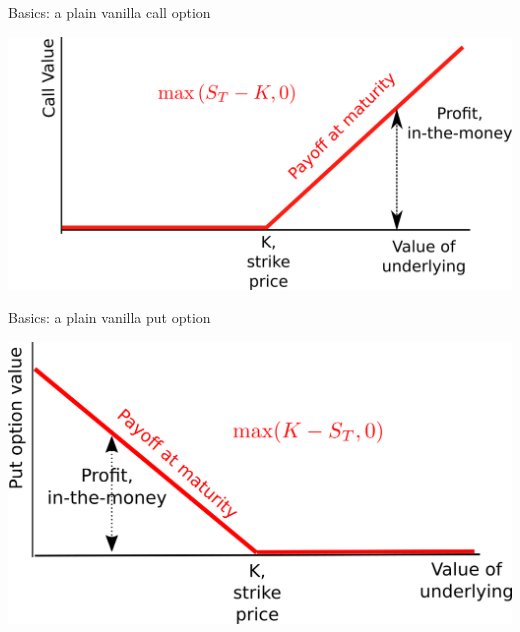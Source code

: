 \documentclass[ignorenonframetext,aspectratio=169]{beamer}
\begin{document}
\begin{frame}{Basics: a plain vanilla call option}

\begin{center}\includegraphics[width=0.8\linewidth]{images/figCallOptionMaturity} \end{center}

\end{frame}

\begin{frame}{Basics: a plain vanilla put option}

\begin{center}\includegraphics[width=0.8\linewidth]{images/figPutOptionMaturity} \end{center}

\end{frame}
\end{document}
